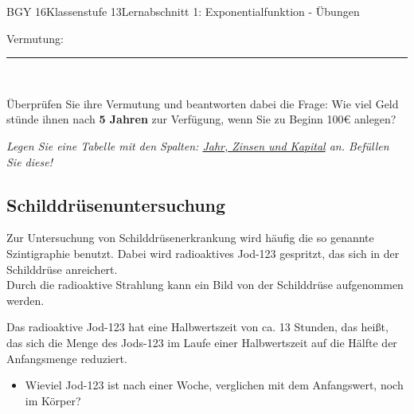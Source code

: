 \documentclass[oneside,openany,headings=optiontotoc,11pt,numbers=noenddot]{scrreprt}
\begin{document}
\begin{worksheet}{BGY 16}{Klassenstufe 13}{Lernabschnitt 1: Exponentialfunktion - Übungen}
\begin{framed}
			\par\bigskip\noindent
			Vermutung: \rule{0.8\textwidth}{0.1pt}\\
			\par\bigskip\noindent
			Überprüfen Sie ihre Vermutung und beantworten dabei die Frage: Wie viel Geld stünde ihnen nach \textbf{5 Jahren} zur Verfügung, wenn Sie zu Beginn 100\euro{} anlegen?\\
			\par
			\textit{Legen Sie eine Tabelle mit den Spalten: \underline{Jahr, Zinsen und Kapital} an. Befüllen Sie diese!}
		\end{framed}
		\newpage
		\begin{framed}
			\noindent
			\section*{Schilddrüsenuntersuchung}
			Zur Untersuchung von Schilddrüsenerkrankung wird häufig die so genannte Szintigraphie benutzt. Dabei wird radioaktives Jod-123 gespritzt, das sich in der Schilddrüse anreichert.\\
			Durch die radioaktive Strahlung kann ein Bild von der Schilddrüse aufgenommen werden.\\
			\par\bigskip\noindent
			Das radioaktive Jod-123 hat eine Halbwertszeit von ca. 13 Stunden, das heißt, das sich die Menge des Jods-123 im Laufe einer Halbwertszeit auf die Hälfte der Anfangsmenge reduziert.\\
			\begin{itemize}
				\item Wieviel Jod-123 ist nach einer Woche, verglichen mit dem Anfangswert, noch im Körper?
			\end{itemize}
		\end{framed}
	\end{worksheet}
\end{document}
